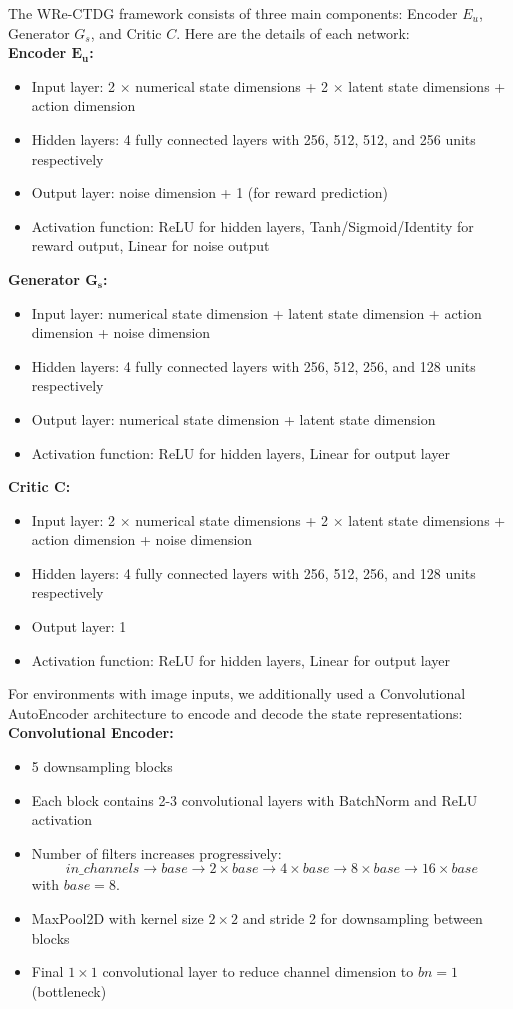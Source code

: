 The WRe-CTDG framework consists of three main components:
Encoder $E_u$, Generator $G_s$, and Critic $C$.
Here are the details of each network:\\
\textbf{Encoder $\mathbf{E_u}$:}
\begin{itemize}
    \item Input layer: 2 $\times$ numerical state dimensions
    + 2 $\times$ latent state dimensions + action dimension
    \item Hidden layers: 4 fully connected layers with 256, 512, 512, and 256 units respectively
    \item Output layer: noise dimension + 1 (for reward prediction)
    \item Activation function: ReLU for hidden layers,
    Tanh/Sigmoid/Identity for reward output, Linear for noise output
\end{itemize}
\textbf{Generator $\mathbf{G_s}$:}
\begin{itemize}
    \item Input layer: numerical state dimension
    + latent state dimension + action dimension +
    noise dimension
    \item Hidden layers: 4 fully connected layers
    with 256, 512, 256, and 128 units respectively
    \item Output layer: numerical state dimension
    + latent state dimension
    \item Activation function: ReLU for hidden layers,
    Linear for output layer
\end{itemize}
\textbf{Critic $\mathbf{C}$:}
\begin{itemize}
    \item Input layer: 2 $\times$ numerical state dimensions
    + 2 $\times$ latent state dimensions + action dimension
    + noise dimension
    \item Hidden layers: 4 fully connected layers with 256,
    512, 256, and 128 units respectively
    \item Output layer: 1
    \item Activation function: ReLU
    for hidden layers, Linear for output layer
\end{itemize}
For environments with image inputs, we additionally used a
Convolutional AutoEncoder architecture to
encode and decode the state representations:\\
\textbf{Convolutional Encoder:}
\begin{itemize}
    \item 5 downsampling blocks
    \item Each block contains 2-3 convolutional layers
    with BatchNorm and ReLU activation
    \item Number of filters increases progressively:
    $$ in\_channels \rightarrow base \rightarrow 2
    \times base \rightarrow 4\times base \rightarrow
    8\times base \rightarrow 16\times base $$
    with $base = 8$.
    \item MaxPool2D with kernel size $2\times 2$ and stride
    2 for downsampling between blocks
    \item Final $1\times 1$ convolutional layer to
    reduce channel dimension to $bn = 1$ (bottleneck)
\end{itemize}

